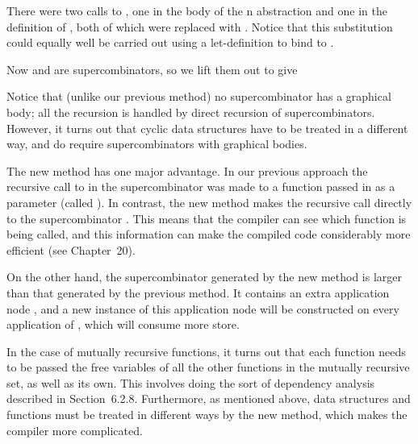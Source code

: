 There were two calls to , one in the body of the \tl n abstraction and one in
the definition of , both of which were replaced with . Notice
that this substitution could equally well be carried out using a let-definition to
bind  to .

Now  and  are supercombinators, so we lift them out to give


\noindent
Notice that (unlike our previous method) no supercombinator has a graphical
body; all the recursion is handled by direct recursion of supercombinators.
However, it turns out that cyclic data structures have to be treated in a
different way, and do require supercombinators with graphical bodies.

The new method has one major advantage. In our previous approach the
recursive call to  in the  supercombinator was made to a function
passed in as a parameter (called ). In contrast, the new method makes
the recursive call directly to the supercombinator . This means that the
compiler can see which function is being called, and this information can
make the compiled code considerably more efficient (see Chapter~20).

On the other hand, the  supercombinator generated by the new
method is larger than that generated by the previous method. It contains an
extra application node , and a new instance of this application node
will be constructed on every application of , which will consume more
store.

In the case of mutually recursive functions, it turns out that each function
needs to be passed the free variables of all the other functions in the mutually
recursive set, as well as its own. This involves doing the sort of dependency
analysis described in Section~6.2.8. Furthermore, as mentioned above, data
structures and functions must be treated in different ways by the new method,
which makes the compiler more complicated.

